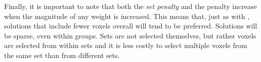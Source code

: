 
Finally, it is important to note that both the {\em set penalty} and the {\lasso} penalty increase when the magnitude of any weight is increased.  This means that, just as with {\lasso}, solutions that include fewer voxels overall will tend to be preferred. Solutions will be sparse, even within groups. Sets are not selected themselves, but rather voxels are selected from within sets and it is less costly to select multiple voxels from the same set than from different sets.

